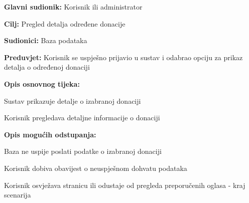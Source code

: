 					\noindent {}
					\begin{packed_item}
	
						\item \textbf{Glavni sudionik: }Korisnik ili administrator
						\item  \textbf{Cilj:} Pregled detalja određene donacije
						\item  \textbf{Sudionici:} Baza podataka
						\item  \textbf{Preduvjet:} Korisnik se uspješno prijavio u sustav i odabrao opciju za prikaz detalja o određenoj donaciji
						\item  \textbf{Opis osnovnog tijeka:}
						
						\item[] \begin{packed_enum}
							\item Sustav prikazuje detalje o izabranoj donaciji
							\item Korisnik pregledava detaljne informacije o donaciji
						\end{packed_enum}

						\item  \textbf{Opis mogućih odstupanja:}

						\item[] \begin{packed_item}
							\item[1.a] Baza ne uspije poslati podatke o izabranoj donaciji
							\item[] \begin{packed_enum}
								
								\item Korisnik dobiva obavijest o neuspješnom dohvatu podataka
								\item Korisnik osvježava stranicu ili odustaje od pregleda preporučenih oglasa - kraj scenarija
							
							\end{packed_enum}	
						\end{packed_item}	
					\end{packed_item}

